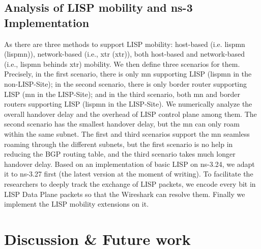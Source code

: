 \subsection{Analysis of LISP mobility and ns-3 Implementation}
As there are three methods to support LISP mobility: host-based (i.e. \acrlong{lispmn} (\acrshort{lispmn})), network-based (i.e., \acrlong{xtr} (\acrshort{xtr})), both host-based and network-based (i.e., \acrshort{lispmn} behinds \acrshort{xtr}) mobility. We then define three scenarios for them. Precisely, in the first scenario, there is only \acrshort{mn} supporting LISP (\acrshort{lispmn} in the non-LISP-Site); in the second scenario, there is only border router supporting LISP (\acrshort{mn} in the LISP-Site); and in the third scenario, both \acrshort{mn} and border routers supporting LISP (\acrshort{lispmn} in the LISP-Site). We numerically analyze the overall handover delay and the overhead of LISP control plane among them. The second scenario has the smallest handover delay, but the \acrshort{mn} can only roam within the same subnet. The first and third scenarios support the \acrshort{mn} seamless roaming through the different subnets, but the first scenario is no help in reducing the BGP routing table, and the third scenario takes much longer handover delay. Based on an implementation of basic LISP on ns-3.24, we adapt it to ns-3.27 first (the latest version at the moment of writing). To facilitate the researchers to deeply track the exchange of LISP packets, we encode every bit in LISP Data Plane packets so that the Wireshark can resolve them. Finally we implement the LISP mobility extensions on it.


\section{Discussion \& Future work}

